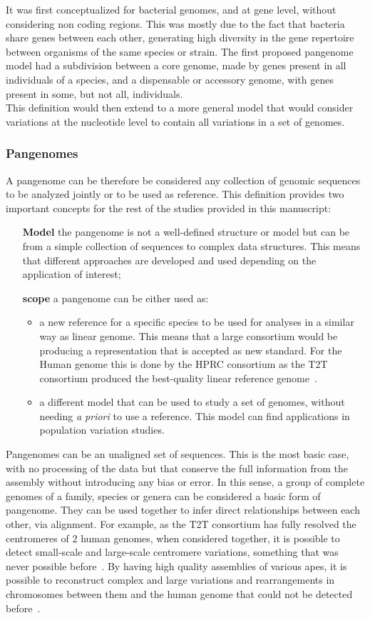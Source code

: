 It was first conceptualized for bacterial genomes, and at gene level, without considering non coding regions. This was mostly due to the fact that bacteria share genes between each other, generating high diversity in the gene repertoire between organisms of the same species or strain.
The first proposed pangenome model had a subdivision between a core genome, made by genes present in all individuals of a species, and a dispensable or accessory genome, with genes present in some, but not all, individuals.\\
This definition would then extend to a more general model that would consider variations at the nucleotide level to contain all variations in a set of genomes.\\
\subsubsection{Pangenomes}
A pangenome can be therefore be considered any collection of genomic sequences to be analyzed jointly or to be used as reference. This definition provides two important concepts for the rest of the studies provided in this manuscript: 
\begin{itemize}
	\item[\textbf{Model}] the pangenome is not a well-defined structure or model but can be from a simple collection of sequences to complex data structures. This means that different approaches are developed and used depending on the application of interest;
	\item[\textbf{scope}] a pangenome can be either used as:
	\begin{itemize}
		\item a new reference for a specific species to be used for analyses in a similar way as linear genome. This means that a large consortium would be producing a representation that is accepted as new standard. For the Human genome this is done by the HPRC consortium as the T2T consortium produced the best-quality linear reference genome~\cite{t2t}.
		\item a different model that can be used to study a set of genomes, without needing \emph{a priori} to use a reference. This model can find applications in population variation studies. 
	\end{itemize} 
\end{itemize}
Pangenomes can be an unaligned set of sequences. This is the most basic case, with no processing of the data but that conserve the full information from the assembly without introducing any bias or error. In this sense, a group of complete genomes of a family, species or genera can be considered a basic form of pangenome. They can be used together to infer direct relationships between each other, via alignment. For example, as the T2T consortium has fully resolved the centromeres of 2 human genomes, when considered together, it is possible to detect small-scale and large-scale centromere variations, something that was never possible before~\cite{centromeres_eichler}. By having high quality assemblies of various apes, it is possible to reconstruct complex and large variations and rearrangements in chromosomes between them and the human genome that could not be detected before~\cite{apes_genomes}.\\
